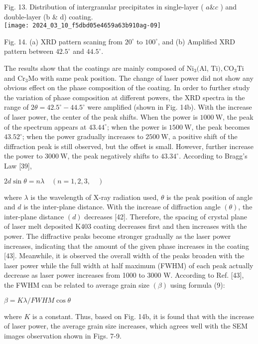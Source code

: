 \documentclass[10pt]{article}
\begin{document}
Fig. 13. Distribution of intergranular precipitates in single-layer ( $a \& c$ ) and double-layer (b \& d) coating.\\
\texttt{[image: 2024\_03\_10\_f5dbd05e4659a63b910ag-09]}

Fig. 14. (a) XRD pattern scaning from $20^{\circ}$ to $100^{\circ}$, and (b) Amplified XRD pattern between $42.5^{\circ}$ and $44.5^{\circ}$.

The results show that the coatings are mainly composed of $\mathrm{Ni}_{3}(\mathrm{Al}$, $\mathrm{Ti}), \mathrm{CO}_{3} \mathrm{Ti}$ and $\mathrm{Cr}_{3} \mathrm{Mo}$ with same peak position. The change of laser power did not show any obvious effect on the phase composition of the coating. In order to further study the variation of phase composition at different powers, the XRD spectra in the range of $2 \theta=42.5^{\circ}-44.5^{\circ}$ were amplified (shown in Fig. 14b). With the increase of laser power, the center of the peak shifts. When the power is $1000 \mathrm{~W}$, the peak of the spectrum appears at $43.44^{\circ}$; when the power is $1500 \mathrm{~W}$, the peak becomes $43.52^{\circ}$; when the power gradually increases to $2500 \mathrm{~W}$, a positive shift of the diffraction peak is still observed, but the offset is small. However, further increase the power to $3000 \mathrm{~W}$, the peak negatively shifts to $43.34^{\circ}$. According to Bragg's Law [39],

$2 d \sin \theta=n \lambda \quad(n=1,2,3, \quad)$

where $\lambda$ is the wavelength of $\mathrm{X}$-ray radiation used, $\theta$ is the peak position of angle and $d$ is the inter-plane distance. With the increase of diffraction angle $(\theta)$, the inter-plane distance $(d)$ decreases [42]. Therefore, the spacing of crystal plane of laser melt deposited K403 coating decreases first and then increases with the power. The diffractive peaks become stronger gradually as the laser power increases, indicating that the amount of the given phase increases in the coating [43]. Meanwhile, it is observed the overall width of the peaks broaden with the laser power while the full width at half maximum (FWHM) of each peak actually decrease as laser power increases from 1000 to 3000 W. According to Ref. [43], the FWHM can be related to average grain size $(\beta)$ using formula (9):

$\beta=K \lambda / F W H M \cos \theta$

where $K$ is a constant. Thus, based on Fig. 14b, it is found that with the increase of laser power, the average grain size increases, which agrees well with the SEM images observation shown in Figs. 7-9.
\end{document}

